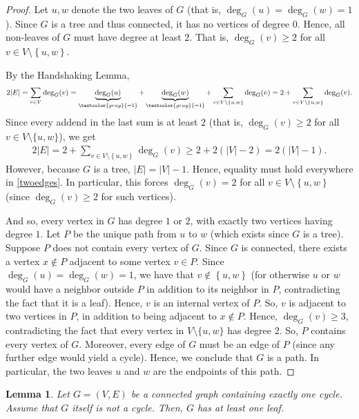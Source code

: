 \documentclass[12pt]{article}
\newtheorem{lemma}[theorem]{Lemma}
\theoremstyle{definition}
\theoremstyle{remark}
\newcommand{\set}[1]{\left\{ #1 \right\}}
\newcommand{\tup}[1]{\left( #1 \right)}
\begin{document}
\begin{proof}
    Let $u,w$ denote the two leaves of $G$ (that is, $\deg_G(u)=\deg_G(w)=1$). Since $G$ is a tree and thus connected, it has no vertices of degree $0$. Hence, all non-leaves of $G$ must have degree at least $2$.
    That is, $\deg_G(v) \geq 2$ for all $v \in V \setminus \set{u,w}$.

    By the Handshaking Lemma, \begin{align*}
        2|E| = \sum_{v \in V}\deg_G(v) = \underbrace{\deg_G(u)}_{\textcolor{gray}{=1}}+\underbrace{\deg_G(w)}_{\textcolor{gray}{=1}}+\sum_{v \in V \setminus \set{u,w}}\deg_G(v) = 2+\sum_{v \in V \setminus \set{u,w}}\deg_G(v).
    \end{align*} Since every addend in the last sum is at least $2$ (that is, $\deg_G(v) \geq 2$ for all $v \in V \setminus \{u,w\}$), we get \begin{align}\label{twoedges}
        2|E|=2+\sum_{v \in V \setminus \set{u,w}}\deg_G(v) \geq 2+2\tup{|V|-2} = 2\tup{|V|-1}.
    \end{align} However, because $G$ is a tree, $|E|=|V|-1$. Hence, equality must hold everywhere in \eqref{twoedges}. In particular, this forces $\deg_G(v)=2$ for all $v \in V \setminus \set{u,w}$ (since $\deg_G(v) \geq 2$ for such vertices). 

    And so, every vertex in $G$ has degree $1$ or $2$, with exactly two vertices having degree $1$. Let $P$ be the unique path from $u$ to $w$ (which exists since $G$ is a tree). Suppose $P$ does not contain every vertex of $G$. Since $G$ is connected, there exists a vertex $x \notin P$ adjacent to some vertex $v \in P$. Since $\deg_G(u)=\deg_G(w)=1$, we have that $v \notin \set{u,w}$ (for otherwise $u$ or $w$ would have a neighbor outside $P$ in addition to its neighbor in $P$, contradicting the fact that it is a leaf). Hence, $v$ is an internal vertex of $P$. So, $v$ is adjacent to two vertices in $P$, in addition to being adjacent to $x \notin P$. Hence, $\deg_G(v) \geq 3$, contradicting the fact that every vertex in $V \setminus \{u,w\}$ has degree $2$. So, $P$ contains every vertex of $G$. Moreover, every edge of $G$ must be an edge of $P$ (since any further edge would yield a cycle). Hence, we conclude that $G$ is a path. In particular, the two leaves $u$ and $w$ are the endpoints of this path.
\end{proof}

\begin{lemma}\label{one_cycle_leaf}
    Let $G=(V,E)$ be a connected graph containing exactly one cycle.
    Assume that $G$ itself is not a cycle.
    Then, $G$ has at least one leaf.
\end{lemma}
\end{document}
